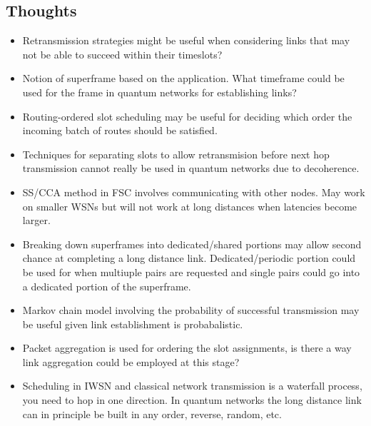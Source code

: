 \documentclass{article}
\begin{document}
\subsection{Thoughts}
\begin{itemize}
    \item Retransmission strategies might be useful when considering links that may not be able to succeed within their timeslots?
    \item Notion of superframe based on the application. What timeframe could be used for the frame in quantum networks for establishing links?
    \item Routing-ordered slot scheduling may be useful for deciding which order the incoming batch of routes should be satisfied.
    \item Techniques for separating slots to allow retransmision before next hop transmission cannot really be used in quantum networks due to decoherence.
    \item SS/CCA method in FSC involves communicating with other nodes.  May work on smaller WSNs but will not work at long distances when latencies become larger.
    \item Breaking down superframes into dedicated/shared portions may allow second chance at completing a long distance link.  Dedicated/periodic portion could be used for when multiuple pairs are requested and single pairs could go into a dedicated portion of the superframe.
    \item Markov chain model involving the probability of successful transmission may be useful given link establishment is probabalistic.
    \item Packet aggregation is used for ordering the slot assignments, is there a way link aggregation could be employed at this stage?
    \item Scheduling in IWSN and classical network transmission is a waterfall process, you need to hop in one direction.  In quantum networks the long distance link can in principle be built in any order, reverse, random, etc.
\end{itemize}
\end{document}
